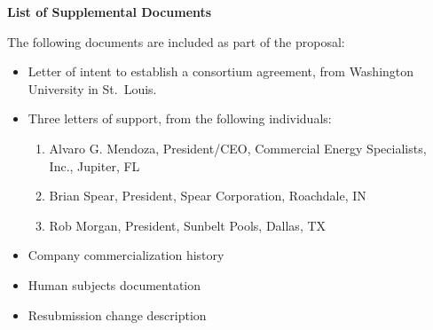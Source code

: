 \documentclass[11pt]{article}
\begin{document}
\pagestyle{empty}
\thispagestyle{empty}

\begin{center}
\textbf{\Large List of Supplemental Documents}
\end{center}

The following documents are included as part of the proposal:

\begin{itemize}

\item Letter of intent to establish a consortium agreement, from Washington
University in St.~Louis.

\item Three letters of support, from the following individuals:

\begin{enumerate}

\item Alvaro G. Mendoza, President/CEO, Commercial Energy
Specialists, Inc., Jupiter, FL

\item Brian Spear, President, Spear Corporation, Roachdale, IN

\item Rob Morgan, President, Sunbelt Pools, Dallas, TX

\end{enumerate}

\item Company commercialization history

\item Human subjects documentation

\item Resubmission change description

\end{itemize}
\end{document}

